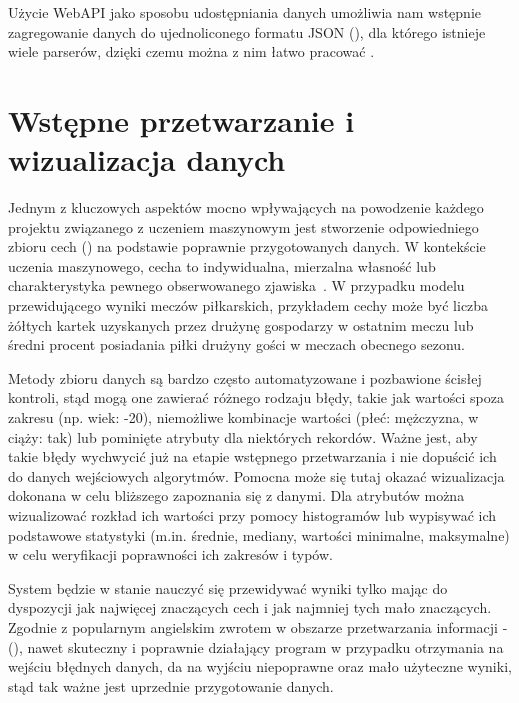 Użycie WebAPI jako sposobu udostępniania danych umożliwia nam wstępnie zagregowanie danych do ujednoliconego formatu JSON (), dla którego istnieje wiele parserów, dzięki czemu można z nim łatwo pracować \cite{JsonParserPython}.

\section{Wstępne przetwarzanie i wizualizacja danych}

\noindent 

Jednym z kluczowych aspektów mocno wpływających na powodzenie każdego projektu związanego z uczeniem maszynowym jest stworzenie odpowiedniego zbioru cech () na podstawie poprawnie przygotowanych danych. W kontekście uczenia maszynowego, cecha to indywidualna, mierzalna własność lub charakterystyka pewnego obserwowanego zjawiska~\cite{Wiki:Feature}. W przypadku modelu przewidującego wyniki meczów piłkarskich, przykładem cechy może być liczba żółtych kartek uzyskanych przez drużynę gospodarzy w ostatnim meczu lub średni procent posiadania piłki drużyny gości w meczach obecnego sezonu.

Metody zbioru danych są bardzo często automatyzowane i pozbawione ścisłej kontroli, stąd mogą one zawierać różnego rodzaju błędy, takie jak wartości spoza zakresu (np. wiek: -20), niemożliwe kombinacje wartości (płeć: mężczyzna, w ciąży: tak) lub pominięte atrybuty dla niektórych rekordów. Ważne jest, aby takie błędy wychwycić już na etapie wstępnego przetwarzania i nie dopuścić ich do danych wejściowych algorytmów. Pomocna może się tutaj okazać wizualizacja dokonana w celu bliższego zapoznania się z danymi. Dla atrybutów można wizualizować rozkład ich wartości przy pomocy histogramów lub wypisywać ich podstawowe statystyki (m.in. średnie, mediany, wartości minimalne, maksymalne) w celu weryfikacji poprawności ich zakresów i typów.

System będzie w stanie nauczyć się przewidywać wyniki tylko mając do dyspozycji jak najwięcej znaczących cech i jak najmniej tych mało znaczących. Zgodnie z popularnym angielskim zwrotem w obszarze przetwarzania informacji -   (), nawet skuteczny i poprawnie działający program w przypadku otrzymania na wejściu błędnych danych, da na wyjściu niepoprawne oraz mało użyteczne wyniki, stąd tak ważne jest uprzednie przygotowanie danych.

